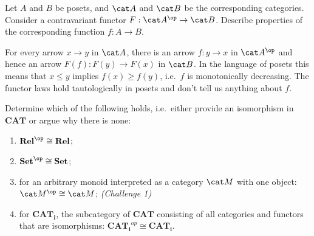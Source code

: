 \begin{exercise}
  Let $A$ and $B$ be posets, and $\A$ and $\B$ be the corresponding categories. Consider a contravariant functor $F:\A^{\op}\rightarrow \B$. Describe properties of the corresponding function $f:A\rightarrow B$.
\end{exercise}

\begin{answer}
  For every arrow $x \to y$ in $\A$, there is an arrow $f : y \to x$ in $\A^\op$ and hence an arrow $F(f) : F(y) \to F(x)$ in $\B$.
  In the language of posets this means that $x \leq y$ implies $f(x) \geq f(y)$, i.e.\ $f$ is monotonically decreasing.
  The functor laws hold tautologically in posets and don't tell us anything about $f$.
\end{answer}

\begin{exercise}
  Determine which of the following holds, i.e.\ either provide an isomorphism in $\mathbf{CAT}$ or argue why there is none:

  \begin{enumerate}
  \item $\mathbf {Rel}^{\op}\cong \mathbf {Rel}$;
  \item $\mathbf {Set}^{\op}\cong \mathbf {Set}$;
  \item for an arbitrary monoid interpreted as a category $\M$ with one object:  $\M^{\op}\cong \M$; \textit{(Challenge 1)}
  \item for $\mathbf{CAT_i}$, the subcategory of $\mathbf{CAT}$ consisting of all categories and functors that are isomorphisms: $\mathbf{CAT_i}^{op}\cong\mathbf{CAT_i}$.
  \end{enumerate}

\end{exercise}

